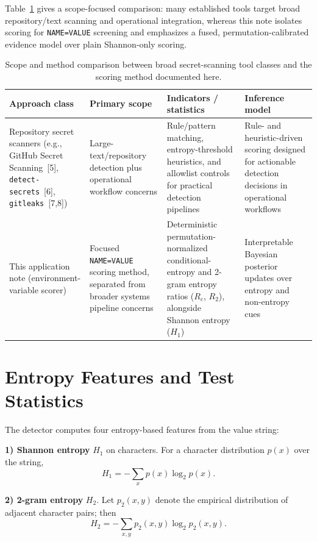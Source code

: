 \documentclass[10pt]{article}
\begin{document}
Table~\ref{tab:method-comparison} gives a scope-focused comparison: many established tools target broad repository/text scanning and operational integration, whereas this note isolates scoring for \texttt{NAME=VALUE} screening and emphasizes a fused, permutation-calibrated evidence model over plain Shannon-only scoring.

\begin{table}[ht]
\centering
\begin{tabular}{|>{\raggedright\arraybackslash}p{3.1cm}|>{\raggedright\arraybackslash}p{3.1cm}|>{\raggedright\arraybackslash}p{5.2cm}|>{\raggedright\arraybackslash}p{3.1cm}|}
\hline
\textbf{Approach class} & \textbf{Primary scope} & \textbf{Indicators / statistics} & \textbf{Inference model} \\
\hline
Repository secret scanners (e.g., GitHub Secret Scanning~[5], \texttt{detect-secrets}~[6], \texttt{gitleaks}~[7,8]) & Large-text/repository detection plus operational workflow concerns & Rule/pattern matching, entropy-threshold heuristics, and allowlist controls for practical detection pipelines & Rule- and heuristic-driven scoring designed for actionable detection decisions in operational workflows \\
\hline
This application note (environment-variable scorer) & Focused \texttt{NAME=VALUE} scoring method, separated from broader systems pipeline concerns & Deterministic permutation-normalized conditional-entropy and 2-gram entropy ratios ($R_c$, $R_2$), alongside Shannon entropy ($H_1$) & Interpretable Bayesian posterior updates over entropy and non-entropy cues \\
\hline
\end{tabular}
\caption{Scope and method comparison between broad secret-scanning tool classes and the scoring method documented here.}
\label{tab:method-comparison}
\end{table}

\section*{Entropy Features and Test Statistics}

The detector computes four entropy-based features from the value string:

\textbf{1) Shannon entropy} $H_1$ on characters.
For a character distribution $p(x)$ over the string,
\[
H_1 = -\sum_x p(x)\log_2 p(x).
\]

\textbf{2) 2-gram entropy} $H_2$.
Let $p_2(x,y)$ denote the empirical distribution of adjacent character pairs; then
\[
H_2 = -\sum_{x,y} p_2(x,y)\log_2 p_2(x,y).
\]
\end{document}
